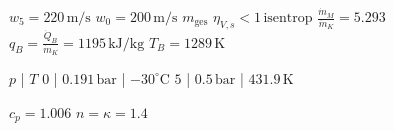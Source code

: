 \( w_5 = 220 \, \text{m/s} \)  
\( w_0 = 200 \, \text{m/s} \)  
\( m_{\text{ges}} \)  
\( \eta_{V,s} < 1 \, \text{isentrop} \)  
\( \frac{\dot{m}_M}{\dot{m}_K} = 5.293 \)  
\( q_B = \frac{\dot{Q}_B}{\dot{m}_K} = 1195 \, \text{kJ/kg} \)  
\( T_B = 1289 \, \text{K} \)  

\( p \) | \( T \)  
\( 0 \) | \( 0.191 \, \text{bar} \) | \( -30^\circ \text{C} \)  
\( 5 \) | \( 0.5 \, \text{bar} \) | \( 431.9 \, \text{K} \)  

\( c_p = 1.006 \)  
\( n = \kappa = 1.4 \)
